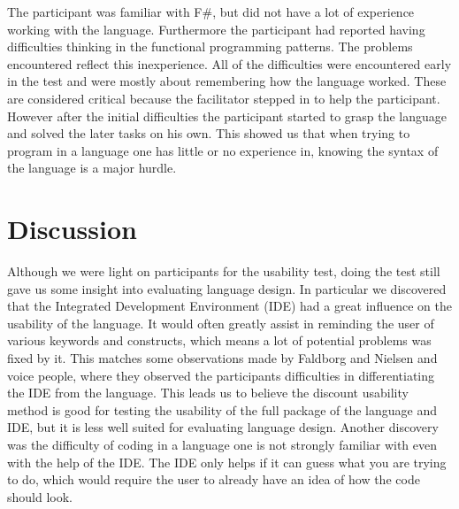 The participant was familiar with F\#, but did not have a lot of experience working with the language.
Furthermore the participant had reported having difficulties thinking in the functional programming patterns.
The problems encountered reflect this inexperience.
All of the difficulties were encountered early in the test and were mostly about remembering how the language worked.
These are considered critical because the facilitator stepped in to help the participant.
However after the initial difficulties the participant started to grasp the language and solved the later tasks on his own.
This showed us that when trying to program in a language one has little or no experience in, knowing the syntax of the language is a major hurdle.

\chapter{Discussion}
Although we were light on participants for the usability test, doing the test still gave us some insight into evaluating language design.
In particular we discovered that the Integrated Development Environment (IDE) had a great influence on the usability of the language.
It would often greatly assist in reminding the user of various keywords and constructs, which means a lot of potential problems was fixed by it.
This matches some observations made by Faldborg and Nielsen \cite{DartTypeSys} and voice people, where they observed the participants difficulties in differentiating the IDE from the language. %
This leads us to believe the discount usability method is good for testing the usability of the full package of the language and IDE, but it is less well suited for evaluating language design.
Another discovery was the difficulty of coding in a language one is not strongly familiar with even with the help of the IDE.
The IDE only helps if it can guess what you are trying to do, which would require the user to already have an idea of how the code should look.